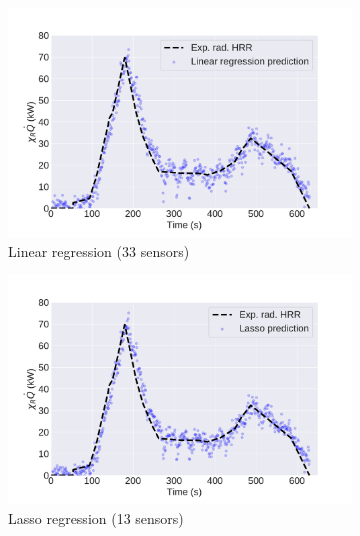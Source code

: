 \documentclass{article}
\begin{document}
\begin{figure}[htbp]
  \centering
  \begin{subfigure}[t]{.45\textwidth}
      \centering
      \includegraphics[width=\textwidth,keepaspectratio]{figures/linreg_rad.pdf}
      \caption{Linear regression (33 sensors)}
      \label{fig:linreg_rad}
  \end{subfigure}
  \begin{subfigure}[t]{.45\textwidth}
      \centering
      \includegraphics[width=\textwidth ,keepaspectratio]{figures/lasso_rad.pdf}
      \caption{Lasso regression (13 sensors)}
      \label{fig:lasso_rad}
  \end{subfigure}
  \caption{} 
  \label{fig:dft_regressions}
\end{figure}
\end{document}
